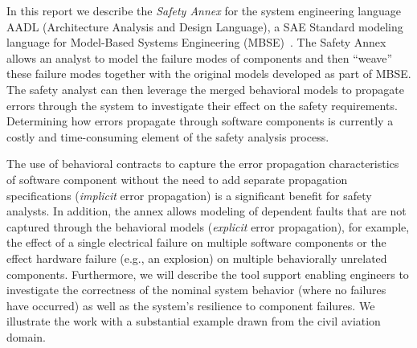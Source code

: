 In this report we describe the \emph{Safety Annex} for the system engineering language AADL (Architecture Analysis and Design Language), a SAE Standard modeling language for Model-Based Systems Engineering (MBSE)~\cite{AADL_Standard}. The Safety Annex allows an analyst to model the failure modes of components and then ``weave'' these failure modes together with the original models developed as part of MBSE. The safety analyst can then leverage the merged behavioral models to propagate %
errors through the system to investigate their effect on the safety requirements. %
Determining how %
errors propagate through software components is currently a costly and time-consuming element of the safety analysis process. 
\begin{comment} 
The use of behavioral contracts to capture the implicit %
error propagation characteristics of software component is a significant benefit for safety analysts.  
In addition, the annex allows modeling of explicit %
error propagation that is not captured through the behavioral models, for example, the effect of a single electrical failure on multiple software components or the effect hardware failure (e.g., an explosion) on multiple behaviorally unrelated components. 
\end{comment}
The use of behavioral contracts to capture the %
error propagation characteristics of software component without the need to add separate propagation specifications (\emph{implicit} error propagation) is a significant benefit for safety analysts.  
In addition, the annex allows modeling of %
dependent faults that are not captured through the behavioral models (\emph{explicit} error propagation),
for example, the effect of a single electrical failure on multiple software components or the effect hardware failure (e.g., an explosion) on multiple behaviorally unrelated components. 
Furthermore, we will describe the tool support enabling engineers to investigate the correctness of the nominal system behavior (where no failures have occurred) as well as the system's resilience to component failures. We illustrate the work with a substantial example drawn from the civil aviation domain.

